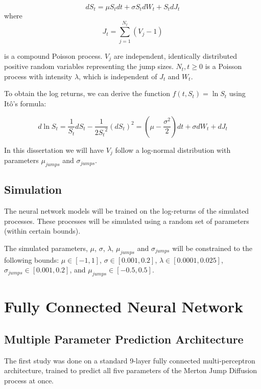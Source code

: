 \documentclass[11pt,oneside,openany,a4paper,english, report, goldenblock
]{usthesis}
\begin{document}
\begin{equation}
d S_t =  \mu S_t dt  +\sigma S_t dW_t + S_t dJ_t 
\end{equation}
where
\begin{equation}
J_t = \sum_{j=1}^{N_t}(V_j - 1)
\end{equation}

is a compound Poisson process. $V_j$ are independent, identically distributed positive random variables representing the jump sizes. $N_t, t \geq 0$ is a Poisson process with intensity $\lambda$, which is independent of $J_t$ and $W_t$.

To obtain the log returns, we can derive the function $f(t, S_t) = \ln{S_t}$ using It\^{o}'s formula:

\begin{equation} \label{equation:merton_log_returns}
d\ln{S_t} = \frac{1}{S_t}dS_t - \frac{1}{2{S_t}^2}\left(dS_t\right)^2 = \left( \mu - \frac{\sigma^2}{2} \right)dt +\sigma dW_t + dJ_t 
\end{equation}

In this dissertation we will have $V_j$ follow a log-normal distribution with parameters $\mu_{jumps}$ and $\sigma_{jumps}$.

\subsection{Simulation}
The neural network models will be trained on the log-returns of the simulated processes. These processes will be simulated using a random set of parameters (within certain bounds).

The simulated parameters, $\mu$, $\sigma$, $\lambda$, $\mu_{jumps}$ and $\sigma_{jumps}$ will be constrained to the following bounds: $\mu \in [-1, 1]$, $\sigma \in [0.001, 0.2]$, $\lambda\in [0.0001, 0.025]$, $\sigma_{jumps} \in [0.001, 0.2]$, and $\mu_{jumps}\in [-0.5, 0.5]$.

\section{Fully Connected Neural Network}

\subsection{Multiple Parameter Prediction Architecture} \label{subsection:fully_connected_ff_nn:architecture}
The first study was done on a standard 9-layer fully connected multi-perceptron architecture, trained to predict all five parameters of the Merton Jump Diffusion process at once.
\end{document}
